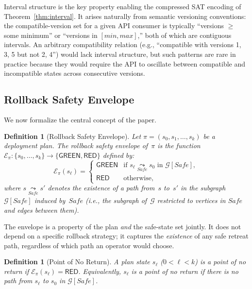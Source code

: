 \documentclass[10pt,twocolumn]{article}
\newtheorem{definition}[theorem]{Definition}
\begin{document}
Interval structure is the key property enabling the compressed SAT encoding
of Theorem~\ref{thm:interval}.  It arises naturally from semantic
versioning conventions: the compatible-version set for a given API consumer
is typically ``versions $\geq$ some minimum'' or ``versions in
$[\textit{min}, \textit{max}]$,'' both of which are contiguous intervals.
An arbitrary compatibility relation (e.g., ``compatible with versions 1, 3,
5 but not 2, 4'') would lack interval structure, but such patterns are
rare in practice because they would require the API to oscillate between
compatible and incompatible states across consecutive versions.

\subsection{Rollback Safety Envelope}
\label{sec:formal:envelope}

We now formalize the central concept of the paper.

\begin{definition}[Rollback Safety Envelope]
\label{def:envelope}
Let $\pi = (s_0, s_1, \ldots, s_k)$ be a deployment plan.  The
\emph{rollback safety envelope} of~$\pi$ is the function
$\mathcal{E}_\pi \colon \{s_0, \ldots, s_k\} \to
\{\mathsf{GREEN}, \mathsf{RED}\}$ defined by:
\[
  \mathcal{E}_\pi(s_\ell) =
  \begin{cases}
    \mathsf{GREEN} & \text{if } s_\ell \underset{\mathit{Safe}}{\leadsto}
      s_0 \text{ in } \mathcal{G}[\mathit{Safe}], \\
    \mathsf{RED}   & \text{otherwise,}
  \end{cases}
\]
where $s \underset{\mathit{Safe}}{\leadsto} s'$ denotes the existence of a
path from~$s$ to~$s'$ in the subgraph $\mathcal{G}[\mathit{Safe}]$ induced
by~$\mathit{Safe}$ (i.e., the subgraph of~$\mathcal{G}$ restricted to
vertices in $\mathit{Safe}$ and edges between them).
\end{definition}

\noindent
The envelope is a property of the plan \emph{and} the safe-state set
jointly.  It does not depend on a specific rollback strategy; it captures
the \emph{existence} of any safe retreat path, regardless of which path an
operator would choose.

\begin{definition}[Point of No Return]
\label{def:ponr}
A plan state $s_\ell$ ($0 < \ell < k$) is a \emph{point of no return} if
$\mathcal{E}_\pi(s_\ell) = \mathsf{RED}$.  Equivalently, $s_\ell$ is a
point of no return if there is no path from $s_\ell$ to $s_0$ in
$\mathcal{G}[\mathit{Safe}]$.
\end{definition}
\end{document}

